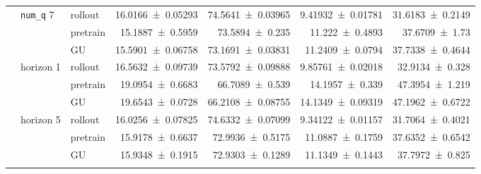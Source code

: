 {\begin{longtable}{@{}lllrrrr@{}}
    \addlinespace[2pt]
     & \texttt{num\_q} 7 & rollout & \num{16.0166+-0.05293} & \num{74.5641+-0.03965} & \num{9.41932+-0.01781} & \num{31.6183+-0.2149} \\
     &  & pretrain & \num{15.1887+-0.5959} & \num{73.5894+-0.235} & \num{11.222+-0.4893} & \num{37.6709+-1.73} \\
     &  & GU & \num{15.5901+-0.06758} & \num{73.1691+-0.03831} & \num{11.2409+-0.0794} & \num{37.7338+-0.4644} \\
    \addlinespace[2pt]
     & horizon 1 & rollout & \num{16.5632+-0.09739} & \num{73.5792+-0.09888} & \num{9.85761+-0.02018} & \num{32.9134+-0.328} \\
     &  & pretrain & \num{19.0954+-0.6683} & \num{66.7089+-0.539} & \num{14.1957+-0.339} & \num{47.3954+-1.219} \\
     &  & GU & \num{19.6543+-0.0728} & \num{66.2108+-0.08755} & \num{14.1349+-0.09319} & \num{47.1962+-0.6722} \\
    \addlinespace[2pt]
     & horizon 5 & rollout & \num{16.0256+-0.07825} & \num{74.6332+-0.07099} & \num{9.34122+-0.01157} & \num{31.7064+-0.4021} \\
     &  & pretrain & \num{15.9178+-0.6637} & \num{72.9936+-0.5175} & \num{11.0887+-0.1759} & \num{37.6352+-0.6542} \\
     &  & GU & \num{15.9348+-0.1915} & \num{72.9303+-0.1289} & \num{11.1349+-0.1443} & \num{37.7972+-0.825} \\
    \addlinespace[2pt]
  \end{longtable}
}
